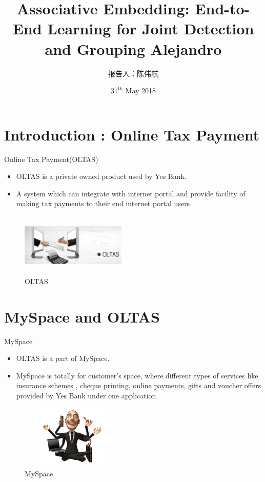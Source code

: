 \documentclass{ctexbeamer}
\title[NIPS2017]{Associative Embedding: End-to-End Learning for Joint Detection and Grouping Alejandro}
\author{报告人：陈伟航\\}
\institute{\bf South China University of Technology}
\date{$31^{\text{th}}$ May 2018}
\begin{document}
  
  \begin{frame}
    \titlepage
  \end{frame}
  
  
  \section{Introduction : Online Tax Payment}
  
  \begin{frame}{Online Tax Payment(OLTAS)}
  
  \begin{itemize}
    \item OLTAS is a private owned product used by Yes Bank.
    \item A system which can integrate with internet portal and provide facility of making tax payments to their end internet portal users.
  \end{itemize}
  
  \begin{figure}
  \includegraphics[width=5cm ,height= 3cm]{fig/oltas-header.jpg}
  \caption{\label{fig:your-figure-1}OLTAS}
  \end{figure}
  \vskip 1cm
  
  \end{frame}
  
  \section{MySpace and OLTAS}
  
  \begin{frame}{MySpace}
  
  \begin{itemize}
    \item OLTAS is a part of MySpace.
    \item MySpace is totally for customer’s space, where different types of services like insurance schemes , cheque printing, online payments, gifts and voucher offers provided by Yes Bank under one application.
  
  \end{itemize}
  
  \begin{figure}
  \includegraphics[width=5cm ,height= 3cm]{fig/multitasking_cartoon.jpg}
  \caption{\label{fig:your-figure}MySpace}
  \end{figure}
  \vskip 1cm
  
  \end{frame}
  
\end{document}
